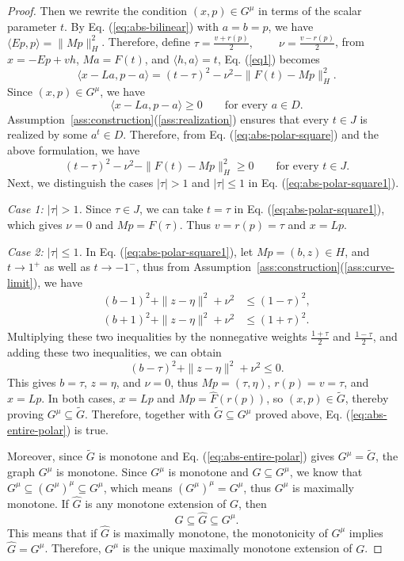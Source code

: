 \documentclass[11pt]{article}
\newcommand{\pair}[2]{\langle #1,#2\rangle}
\theoremstyle{definition}
\theoremstyle{remark}
\begin{document}
\begin{proof}
Then we rewrite the condition $(x,p)\in G^\mu$ in terms of the scalar parameter $t$. 
By Eq. (\ref{eq:abs-bilinear}) with $a=b=p$, we have $\pair{Ep}{p}=\|Mp\|_H^2$.  Therefore, define $\tau=\frac{v+r(p)}2,~\qquad \nu=\frac{v-r(p)}2$, from $x=-Ep+vh$, $Ma=F(t)$, and $\pair{h}{a}=t$, Eq. (\ref{eq1}) becomes 
\begin{equation}
\pair{x-La}{p-a}
=(t-\tau)^2-\nu^2-\|F(t)-Mp\|_H^2.
\label{eq:abs-polar-square}
\end{equation}
Since $(x,p)\in G^\mu$, we have 
\[
\pair{x-La}{p-a}\ge0
\qquad\text{for every }a\in D.
\]
Assumption~\ref{ass:construction}\textup{(\ref{ass:realization})} ensures that every $t\in J$ is realized by some $a^t\in D$. Therefore, from Eq. (\ref{eq:abs-polar-square}) and the above formulation, we have 
\begin{equation}
(t-\tau)^2-\nu^2-\|F(t)-Mp\|_H^2\ge0
\qquad\text{for every }t\in J.
\label{eq:abs-polar-square1}
\end{equation}
Next, we distinguish the cases $|\tau|>1$ and $|\tau|\le1$ in Eq. (\ref{eq:abs-polar-square1}).





\emph{Case 1: $|\tau|>1$.}  Since $\tau\in J$, we can take $t=\tau$ in Eq. (\ref{eq:abs-polar-square1}), which gives $\nu=0$ and $Mp=F(\tau)$. Thus $v=r(p)=\tau$ and $x=Lp$.

\emph{Case 2: $|\tau|\le1$.} In Eq. (\ref{eq:abs-polar-square1}), let $Mp=(b,z)\in H$, and $t\to1^+$ as well as $t\to-1^-$, thus from Assumption~\ref{ass:construction}\textup{(\ref{ass:curve-limit})}, we have 
\[
\begin{aligned}
(b-1)^2+\|z-\eta\|^2+\nu^2&\le(1-\tau)^2,\\
(b+1)^2+\|z-\eta\|^2+\nu^2&\le(1+\tau)^2.
\end{aligned}
\]
Multiplying these two inequalities by the nonnegative weights $\frac{1+\tau}{2}$ and $\frac{1-\tau}{2}$, and adding these two inequalities, we can obtain
\[
(b-\tau)^2+\|z-\eta\|^2+\nu^2\le0.
\]
This gives $b=\tau$, $z=\eta$, and $\nu=0$, thus $Mp=(\tau,\eta)$, $r(p)=v=\tau$, and $x=Lp$.
In both cases, $x=Lp$ and $Mp=\widehat F(r(p))$, so $(x,p)\in\widetilde G$, thereby proving $G^\mu\subseteq\widetilde G$. Therefore, together with $\widetilde G\subseteq G^\mu$ proved above, Eq. (\ref{eq:abs-entire-polar}) is true.





Moreover, since $\widetilde G$ is monotone and Eq. (\ref{eq:abs-entire-polar}) gives $G^\mu=\widetilde G$, the graph $G^\mu$ is monotone. Since $G^\mu$ is monotone and $G\subseteq G^\mu$, we know that $G^\mu\subseteq (G^\mu)^\mu\subseteq G^\mu$, which means $(G^\mu)^\mu=G^\mu$, thus $G^\mu$ is maximally monotone. 
If $\widehat G$ is any monotone extension of $G$, then 
\[
G\subseteq\widehat G\subseteq G^\mu.
\]
This means that if $\widehat G$ is maximally monotone, the monotonicity of $G^\mu$ implies $\widehat G=G^\mu$. Therefore, $G^\mu$ is the unique maximally monotone extension of $G$.  








\end{proof}
\end{document}
